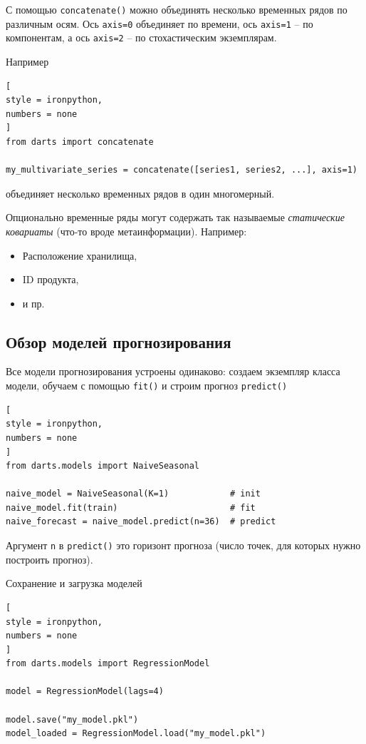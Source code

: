 \documentclass[%
	11pt,
	a4paper,
	utf8,
		]{article}
\begin{document}
С помощью \verb|concatenate()| можно объединять несколько временных рядов по различным осям. Ось \verb|axis=0| объединяет по времени, ось \verb|axis=1| -- по компонентам, а ось \verb|axis=2| -- по стохастическим экземплярам.

Например
\begin{lstlisting}[
style = ironpython,
numbers = none
]
from darts import concatenate

my_multivariate_series = concatenate([series1, series2, ...], axis=1)
\end{lstlisting}
объединяет несколько временных рядов в один многомерный.

Опционально временные ряды могут содержать так называемые \emph{статические ковариаты} (что-то вроде метаинформации). Например:
\begin{itemize}
	\item Расположение хранилища,
	
	\item ID продукта,
	
	\item и пр.
\end{itemize}

\subsection{Обзор моделей прогнозирования}

Все модели прогнозирования устроены одинаково: создаем экземпляр класса модели, обучаем с помощью \verb|fit()| и строим прогноз \verb|predict()|
\begin{lstlisting}[
style = ironpython,
numbers = none	
]
from darts.models import NaiveSeasonal

naive_model = NaiveSeasonal(K=1)            # init
naive_model.fit(train)                      # fit
naive_forecast = naive_model.predict(n=36)  # predict
\end{lstlisting}

Аргумент \verb|n| в \verb|predict()| это горизонт прогноза (число точек, для которых нужно построить прогноз).

Сохранение и загрузка моделей
\begin{lstlisting}[
style = ironpython,
numbers = none
]
from darts.models import RegressionModel

model = RegressionModel(lags=4)

model.save("my_model.pkl")
model_loaded = RegressionModel.load("my_model.pkl")
\end{lstlisting}
\end{document}
